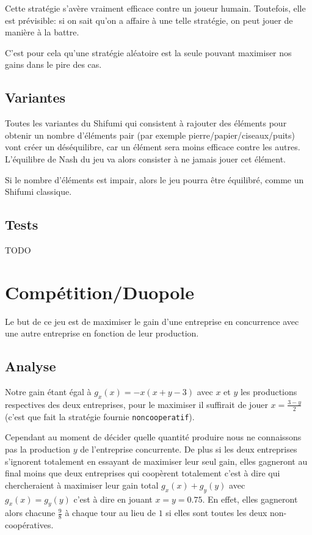\documentclass{scrartcl}
\begin{document}
    Cette stratégie s'avère vraiment efficace contre un joueur humain.
    Toutefois, elle est prévisible: si on sait qu'on a affaire à une telle
    stratégie, on peut jouer de manière à la battre.

    C'est pour cela qu'une stratégie aléatoire est la seule pouvant maximiser
    nos gains dans le pire des cas.

  \subsection{Variantes}
    Toutes les variantes du Shifumi qui consistent à rajouter des éléments
    pour obtenir un nombre d'éléments pair (par exemple
    pierre/papier/ciseaux/puits) vont créer un déséquilibre, car un élément
    sera moins efficace contre les autres. L'équilibre de Nash du jeu va
    alors consister à ne jamais jouer cet élément.

    Si le nombre d'éléments est impair, alors le jeu pourra être équilibré,
    comme un Shifumi classique.

  \subsection{Tests}
    TODO


\section{Compétition/Duopole}
  Le but de ce jeu est de maximiser le gain d'une entreprise en concurrence
  avec une autre entreprise en fonction de leur production.

  \subsection{Analyse}
    Notre gain étant égal à $g_x(x) = -x(x+y-3)$ avec $x$ et $y$ les
    productions respectives des deux entreprises, pour le maximiser il
    suffirait de jouer $x=\frac{3-y}{2}$ (c'est que fait la stratégie fournie
    \verb+noncooperatif+).
    
    Cependant au moment de décider quelle quantité produire nous ne connaissons
    pas la production $y$ de l'entreprise concurrente. De plus si les deux
    entreprises s'ignorent totalement en essayant de maximiser leur seul gain,
    elles gagneront au final moins que deux entreprises qui coopèrent
    totalement c'est à dire qui chercheraient à maximiser leur gain total
    $g_x(x)+g_y(y)$ avec $g_x(x) = g_y(y)$ c'est à dire en jouant $x=y=0.75$.
    En effet, elles gagneront alors chacune $\frac 9 8$ à chaque tour au lieu
    de $1$ si elles sont toutes les deux non-coopératives.
\end{document}
